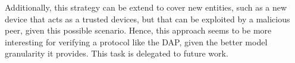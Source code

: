 Additionally, this strategy can be extend to cover new entities, such as a new device that acts as a trusted devices, but that can be exploited by a malicious peer, given this possible scenario. Hence, this approach seems to be more interesting for verifying a protocol like the DAP, given the better model granularity it provides. This task is delegated to future work.
